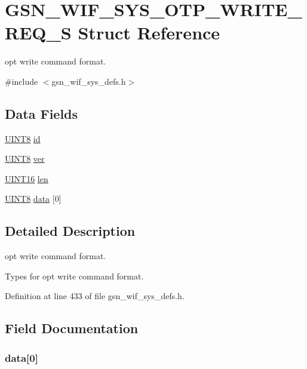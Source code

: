 \hypertarget{a00360}{
\section{GSN\_\-WIF\_\-SYS\_\-OTP\_\-WRITE\_\-REQ\_\-S Struct Reference}
\label{a00360}
}


opt write command format.  




{\ttfamily \#include $<$gsn\_\-wif\_\-sys\_\-defs.h$>$}

\subsection*{Data Fields}
\begin{DoxyCompactItemize}
\item 
\hyperlink{a00660_gab27e9918b538ce9d8ca692479b375b6a}{UINT8} \hyperlink{a00360_a583a14d715339a2c22d205223d366263}{id}
\item 
\hyperlink{a00660_gab27e9918b538ce9d8ca692479b375b6a}{UINT8} \hyperlink{a00360_a2ac44d771c9e31ef7508150a7082e8cf}{ver}
\item 
\hyperlink{a00660_ga09f1a1fb2293e33483cc8d44aefb1eb1}{UINT16} \hyperlink{a00360_ab3bcead9c261261394a5d9b3bf8f95cb}{len}
\item 
\hyperlink{a00660_gab27e9918b538ce9d8ca692479b375b6a}{UINT8} \hyperlink{a00360_a29500e452cff835f2b70d1dff36f918a}{data} \mbox{[}0\mbox{]}
\end{DoxyCompactItemize}


\subsection{Detailed Description}
opt write command format. 

Types for opt write command format. 

Definition at line 433 of file gsn\_\-wif\_\-sys\_\-defs.h.



\subsection{Field Documentation}
\hypertarget{a00360_a29500e452cff835f2b70d1dff36f918a}{
\subsubsection[{data}]{ {\bf data}\mbox{[}0\mbox{]}}}
\label{a00360_a29500e452cff835f2b70d1dff36f918a}


